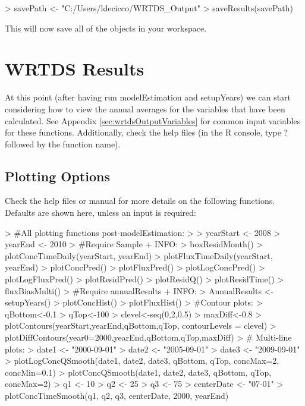 \documentclass[a4paper,11pt]{article}
\begin{document}
\begin{Schunk}
\begin{Sinput}
> savePath <- "C:/Users/ldecicco/WRTDS_Output"
> saveResults(savePath) 
\end{Sinput}
\end{Schunk}

This will now save all of the objects in your workspace.  

\section{WRTDS Results}
\label{sec:wrtdsResults}
At this point (after having run modelEstimation and setupYears) we can start considering how to view the annual averages for the variables that have been calculated.  See Appendix \ref{sec:wrtdsOutputVariables} for common input variables for these functions. Additionally, check the help files (in the R console, type ? followed by the function name).

\subsection{Plotting Options}
\label{sec:wrtdsPlotting}
Check the help files or manual for more details on the following functions.  Defaults are shown here, unless an input is required:

\begin{Schunk}
\begin{Sinput}
> #All plotting functions post-modelEstimation:
> 
> yearStart <- 2008
> yearEnd <- 2010
> #Require Sample + INFO:
> boxResidMonth()
> plotConcTimeDaily(yearStart, yearEnd)
> plotFluxTimeDaily(yearStart, yearEnd)
> plotConcPred()
> plotFluxPred()
> plotLogConcPred()
> plotLogFluxPred()
> plotResidPred()
> plotResidQ()
> plotResidTime()
> fluxBiasMulti()
> #Require annualResults + INFO:
> AnnualResults <- setupYears()
> plotConcHist()
> plotFluxHist()
> #Contour plots:
> qBottom<-0.1
> qTop<-100
> clevel<-seq(0,2,0.5)
> maxDiff<-0.8
> plotContours(yearStart,yearEnd,qBottom,qTop, contourLevels = clevel)
> plotDiffContours(year0=2000,yearEnd,qBottom,qTop,maxDiff)
> # Multi-line plots:
> date1 <- "2000-09-01"
> date2 <- "2005-09-01"
> date3 <- "2009-09-01"
> plotLogConcQSmooth(date1, date2, date3, qBottom, qTop, concMax=2, concMin=0.1)
> plotConcQSmooth(date1, date2, date3, qBottom, qTop, concMax=2)
> q1 <- 10
> q2 <- 25
> q3 <- 75
> centerDate <- "07-01"
> plotConcTimeSmooth(q1, q2, q3, centerDate, 2000, yearEnd)
\end{Sinput}
\end{Schunk}
\end{document}
